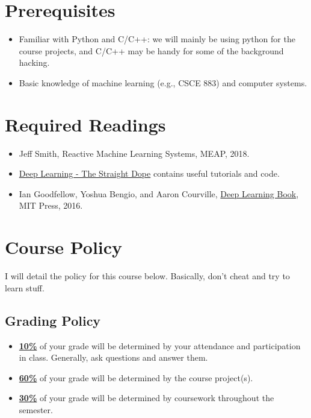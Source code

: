 \documentclass[11pt]{article}
\begin{document}
\section*{Prerequisites}

\begin{itemize}
\item Familiar with Python and C/C++: we will mainly be using python for the course projects, and C/C++ may be handy for some of the background hacking.
\item Basic knowledge of machine learning (e.g., CSCE 883) and computer systems.
\end{itemize}


\section*{Required Readings}

\begin{itemize}
\item Jeff Smith, Reactive Machine Learning Systems, MEAP, 2018.
\item \href{https://gluon.mxnet.io/}{Deep Learning - The Straight Dope} contains useful tutorials and code.
\item Ian Goodfellow, Yoshua Bengio, and Aaron Courville, \href{http://www.deeplearningbook.org/}{Deep Learning Book}, MIT Press, 2016.
\end{itemize} 


\section*{Course Policy}

I will detail the policy for this course below. Basically, don't cheat and try to learn stuff.

\subsection*{Grading Policy}
\begin{itemize}
  \item \underline{\textbf{10\%}} of your grade will be determined by your attendance and participation in class. Generally, ask questions and answer them.

  \item \underline{\textbf{60\%}} of your grade will be determined by the course project(s). 

  \item \underline{\textbf{30\%}} of your grade will be determined by coursework throughout the semester.

\end{itemize}
\end{document}
